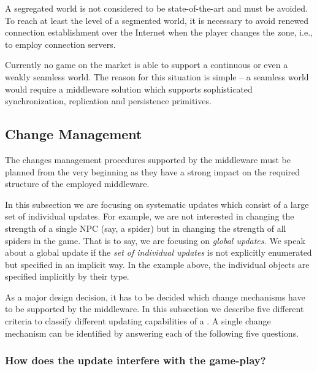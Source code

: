\documentclass[a4paper, 10pt]{book}
\begin{document}
\begin{itemize}
                    A segregated world is not considered to be state-of-the-art and must
                    be avoided. To reach at least the level of a segmented world, it is
                    necessary to avoid renewed connection establishment over the
                    Internet when the player changes the zone, i.e., to employ
                    connection servers.
            \end{itemize}
            Currently no game on the market is able to support a continuous or
            even a weakly seamless world. The reason for this situation is simple
            -- a seamless world would require a middleware solution which supports
            sophisticated synchronization, replication and persistence
            primitives.

            \subsection{Change Management} 

            The changes management procedures supported by the middleware must be 
            planned from the very beginning as they have a strong impact on the required
            structure of the employed middleware.

            In this subsection we are focusing on systematic updates which consist of a
            large set of individual updates. For example, we are not interested in
            changing the strength of a single NPC (say, a spider) but in changing the strength
            of all spiders in the game. That is to say, we are focusing on
            \emph{global updates.}
            We speak about a global update if the \emph{set of individual updates}
            is not explicitly enumerated but specified in an implicit way. In the
            example above, the individual objects are specified implicitly by
            their type.

            As a major design decision, it has to be decided which change
            mechanisms have to be supported by the middleware. 
            In this subsection we describe five different criteria to classify
            different updating capabilities of a \MMORG. A single change
            mechanism can be identified by answering each of the following five
            questions. 



            \subsubsection{How does the update interfere with the game-play?}
            \label{sec:how-does-update}
\end{document}
